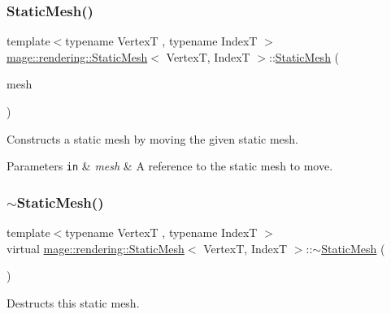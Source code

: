\subsubsection{\texorpdfstring{Static\+Mesh()}{StaticMesh()}\hspace{0.1cm}{\footnotesize\ttfamily [3/3]}}
{\footnotesize\ttfamily template$<$typename VertexT , typename IndexT $>$ \\
\mbox{\hyperlink{classmage_1_1rendering_1_1_static_mesh}{mage\+::rendering\+::\+Static\+Mesh}}$<$ VertexT, IndexT $>$\+::\mbox{\hyperlink{classmage_1_1rendering_1_1_static_mesh}{Static\+Mesh}} (\begin{DoxyParamCaption}\item[{\mbox{\hyperlink{classmage_1_1rendering_1_1_static_mesh}{Static\+Mesh}}$<$ VertexT, IndexT $>$ \&\&}]{mesh }\end{DoxyParamCaption})\hspace{0.3cm}{\ttfamily [noexcept]}}

Constructs a static mesh by moving the given static mesh.


\begin{DoxyParams}[1]{Parameters}
\mbox{\tt in}  & {\em mesh} & A reference to the static mesh to move. \\
\hline
\end{DoxyParams}
\mbox{\label{classmage_1_1rendering_1_1_static_mesh_a44fd6319f4a56ff20bc81fb9968dac05}} 
\subsubsection{\texorpdfstring{$\sim$\+Static\+Mesh()}{~StaticMesh()}}
{\footnotesize\ttfamily template$<$typename VertexT , typename IndexT $>$ \\
virtual \mbox{\hyperlink{classmage_1_1rendering_1_1_static_mesh}{mage\+::rendering\+::\+Static\+Mesh}}$<$ VertexT, IndexT $>$\+::$\sim$\mbox{\hyperlink{classmage_1_1rendering_1_1_static_mesh}{Static\+Mesh}} (\begin{DoxyParamCaption}{ }\end{DoxyParamCaption})\hspace{0.3cm}{\ttfamily [virtual]}}

Destructs this static mesh. 

